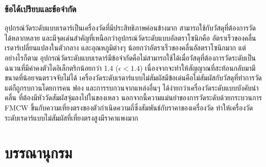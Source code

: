 \documentclass[final,11pt]{article}
\begin{document}
\subsubsection{ข้อได้เปรียบและข้อจำกัด}
อุปกรณ์วัดระดับแบบเรดาร์เป็นเครื่องวัดที่มีประสิทธิภาพค่อนข้างมาก สามารถใช้กับวัสดุที่ต้องการวัดได้หลากหลาย และมีจุดเด่นสำคัญที่เหนือกว่าอุปกรณ์วัดระดับแบบอัลตราโซนิกคือ
อัตราเร็วของคลื่นเรดาร์เปลี่ยนแปลงในตัวกลาง และอุณหภูมิต่างๆ น้อยกว่าอัตราเร็วของคลื่นอัลตราโซนิกมาก แต่อย่างไรก็ตาม 
อุปกรณ์วัดระดับแบบเรดาร์มีข้อจำกัดคือไม่สามารถใช้ได้เมื่อวัสดุที่ต้องการวัดระดับเป็นฉนวนที่มีค่าคงตัวไดอิเล็กตริกน้อยกว่า 1.4 ($\epsilon < 1.4$) 
เนื่องจากจะทำให้สัญญาณที่สะท้อนกลับมามีขนาดที่น้อยจนตรวจจับไม่ได้ เครื่องวัดระดับเรดาร์แบบไม่สัมผัสมีข้อเด่นคือไม่สัมผัสกับวัสดุที่ทำการวัด แต่ก็ถูกรบกวนโดยการคน 
ฟอง และการรบกวนจากแหล่งอื่นๆ ได้ง่ายกว่าเครื่องวัดระดับแบบบังคับนำคลื่น ที่ต้องมีหัววัดสัมผัสจุ่มลงไปในของเหลว นอกจากนี้ความแม่นยำของการวัดระดับด้วยกระบวนการ
FMCW ขึ้นกับความเที่ยงตรงของตัวกำเนิดความถี่ซึ่งสัมพันธ์กับราคาของเครื่องวัด ทำให้เครื่องวัดระดับเรดาร์แบบไม่สัมผัสที่เที่ยงตรงสูงมีราคาแพงมาก
\section{บรรณานุกรม}
\end{document}
